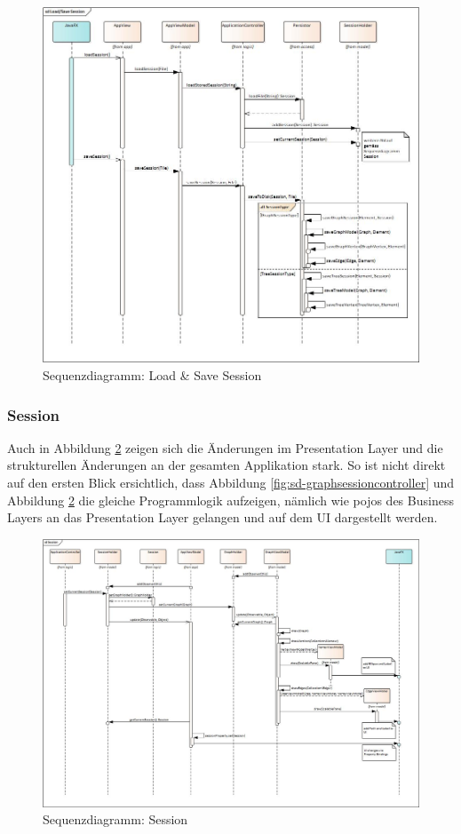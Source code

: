 \documentclass[11pt,a4paper,english,oneside]{book}
\numberwithin{equation}{chapter}
\begin{document}
	\begin{figure}[h!]
		\centering
		\includegraphics[width=\linewidth]{assets/images/sequence_LoadSave_Session}
		\caption{Sequenzdiagramm: Load \& Save Session}
		\label{fig:sd-load_save_session-2}
	\end{figure}
	
	
	\subsubsection{Session}	
	Auch in Abbildung \ref{fig:sd-session-2} zeigen sich die Änderungen im Presentation Layer und die strukturellen Änderungen an der gesamten Applikation stark. So ist nicht direkt auf den ersten Blick ersichtlich, dass Abbildung \ref{fig:sd-graphsessioncontroller} und Abbildung \ref{fig:sd-session-2} die gleiche Programmlogik aufzeigen, nämlich wie \gls{pojo}s des Business Layers an das Presentation Layer gelangen und auf dem UI dargestellt werden.
	
	\begin{figure}[h!]
		\centering
		\includegraphics[width=\linewidth]{assets/images/sequence_Session}
		\caption{Sequenzdiagramm: Session}
		\label{fig:sd-session-2}
	\end{figure}
	
\end{document}
